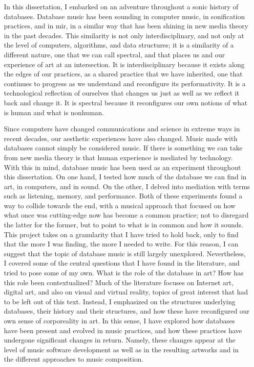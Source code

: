 In this dissertation, I embarked on an adventure throughout a sonic history of databases. Database music has been sounding in computer music, in sonification practices, and in \gls{mir}, in a similar way that has been shining in new media theory in the past decades. This similarity is not only interdisciplinary, and not only at the level of computers, algorithms, and data structures; it is a similarity of a different nature, one that we can call spectral, and that places us and our experience of art at an intersection. It is interdisciplinary because it exists along the edges of our practices, as a shared practice that we have inherited, one that continues to progress as we understand and reconfigure its performativity. It is a technological reflection of ourselves that changes us just as well as we reflect it back and change it. It is spectral because it reconfigures our own notions of what is human and what is nonhuman.

Since computers have changed communications and science in extreme ways in recent decades, our aesthetic experiences have also changed. Music made with databases cannot simply be considered music. If there is something we can take from new media theory is that human experience is mediated by technology. With this in mind, database music has been used as an experiment throughout this dissertation. On one hand, I tested how much of the database we can find in art, in computers, and in sound. On the other, I delved into mediation with terms such as listening, memory, and performance. Both of these experiments found a way to collide towards the end, with a musical approach that focused on how what once was cutting-edge now has become a common practice; not to disregard the latter for the former, but to point to what is in common and how it sounds. This project takes on a granularity that I have tried to hold back, only to find that the more I was finding, the more I needed to write. For this reason, I can suggest that the topic of database music is still largely unexplored. Nevertheless, I covered some of the central questions that I have found in the literature, and tried to pose some of my own. What is the role of the database in art? How has this role been contextualized? Much of the literature focuses on Internet art, digital art, and also on visual and virtual reality, topics of great interest that had to be left out of this text. Instead, I emphasized on the structures underlying databases, their history and their structures, and how these have reconfigured our own sense of corporeality in art. In this sense, I have explored how databases have been present and evolved in music practices, and how these practices have undergone significant changes in return. Namely, these changes appear at the level of music software development as well as in the resulting artworks and in the different approaches to music composition. 

